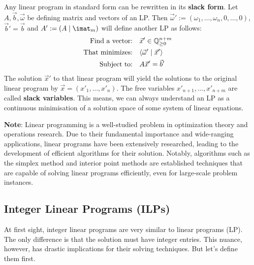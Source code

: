 \begin{observation}
    \label{obs:lp_slack_form}
    Any linear program in standard form can be rewritten in its \textbf{slack form}. Let $A, \vec b, \vec\omega$ be defining matrix and vectors of an LP. Then $\vec\omega' := (\omega_1, \dots, \omega_n, 0, \dots, 0)$, $\vec b' = \vec b$ and $A' := (A\mid\imat_m)$ will define another LP as follows:
    \begin{align*}
        \text{Find a vector:} & \quad \vec x' \in \mathbb{Q}^{n+m}_{\geq 0} \\
        \text{That minimizes:} & \quad \langle \vec \omega' \mid \vec x' \rangle\\
        \text{Subject to:} & \quad A\vec x' = \vec b' \\
    \end{align*}
    The solution $\vec x'$ to that linear program will yield the solutions to the original linear program by $\vec x = (x'_1, \dots, x'_n)$. The free variables $x'_{n+1}, \dots, x'_{n+m}$ are called \textbf{slack variables}. This means, we can always understand an LP as a continuous minimisation of a solution space of some system of linear equations.
\end{observation}

\textbf{Note}: Linear programming is a well-studied problem in optimization theory and operations research. Due to their fundamental importance and wide-ranging applications, linear programs have been extensively researched, leading to the development of efficient algorithms for their solution. Notably, algorithms such as the simplex method and interior point methods are established techniques that are capable of solving linear programs efficiently, even for large-scale problem instances.

\subsection{Integer Linear Programs (ILPs)}
At first sight, integer linear programs are very similar to linear programs (LP). The only difference is that the solution must have integer entries. This nuance, however, has drastic implications for their solving techniques. But let's define them first.

